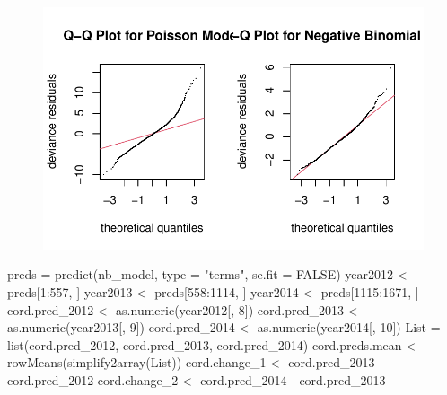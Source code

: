 \documentclass[
  letterpaper,
  DIV=11,
  numbers=noendperiod]{scrartcl}
\newenvironment{Shaded}{\begin{snugshade}}{\end{snugshade}}
\newcommand{\AttributeTok}[1]{\textcolor[rgb]{0.40,0.45,0.13}{#1}}
\newcommand{\ConstantTok}[1]{\textcolor[rgb]{0.56,0.35,0.01}{#1}}
\newcommand{\DecValTok}[1]{\textcolor[rgb]{0.68,0.00,0.00}{#1}}
\newcommand{\FunctionTok}[1]{\textcolor[rgb]{0.28,0.35,0.67}{#1}}
\newcommand{\NormalTok}[1]{\textcolor[rgb]{0.00,0.23,0.31}{#1}}
\newcommand{\OtherTok}[1]{\textcolor[rgb]{0.00,0.23,0.31}{#1}}
\newcommand{\SpecialCharTok}[1]{\textcolor[rgb]{0.37,0.37,0.37}{#1}}
\newcommand{\StringTok}[1]{\textcolor[rgb]{0.13,0.47,0.30}{#1}}
\begin{document}
\begin{figure}[H]

{\centering \includegraphics{Group34Coursework_files/figure-pdf/unnamed-chunk-19-1.pdf}

}

\end{figure}

\begin{Shaded}
\begin{Highlighting}[]
\NormalTok{preds }\OtherTok{=} \FunctionTok{predict}\NormalTok{(nb\_model, }\AttributeTok{type =} \StringTok{"terms"}\NormalTok{, }\AttributeTok{se.fit =} \ConstantTok{FALSE}\NormalTok{)}
\NormalTok{year2012 }\OtherTok{\textless{}{-}}\NormalTok{ preds[}\DecValTok{1}\SpecialCharTok{:}\DecValTok{557}\NormalTok{, ]}
\NormalTok{year2013 }\OtherTok{\textless{}{-}}\NormalTok{ preds[}\DecValTok{558}\SpecialCharTok{:}\DecValTok{1114}\NormalTok{, ]}
\NormalTok{year2014 }\OtherTok{\textless{}{-}}\NormalTok{ preds[}\DecValTok{1115}\SpecialCharTok{:}\DecValTok{1671}\NormalTok{, ]}
\NormalTok{cord.pred\_2012 }\OtherTok{\textless{}{-}} \FunctionTok{as.numeric}\NormalTok{(year2012[, }\DecValTok{8}\NormalTok{])}
\NormalTok{cord.pred\_2013 }\OtherTok{\textless{}{-}} \FunctionTok{as.numeric}\NormalTok{(year2013[, }\DecValTok{9}\NormalTok{])}
\NormalTok{cord.pred\_2014 }\OtherTok{\textless{}{-}} \FunctionTok{as.numeric}\NormalTok{(year2014[, }\DecValTok{10}\NormalTok{])}
\NormalTok{List }\OtherTok{=} \FunctionTok{list}\NormalTok{(cord.pred\_2012, cord.pred\_2013, cord.pred\_2014)}
\NormalTok{cord.preds.mean }\OtherTok{\textless{}{-}} \FunctionTok{rowMeans}\NormalTok{(}\FunctionTok{simplify2array}\NormalTok{(List))}
\NormalTok{cord.change\_1 }\OtherTok{\textless{}{-}}\NormalTok{ cord.pred\_2013 }\SpecialCharTok{{-}}\NormalTok{ cord.pred\_2012}
\NormalTok{cord.change\_2 }\OtherTok{\textless{}{-}}\NormalTok{ cord.pred\_2014 }\SpecialCharTok{{-}}\NormalTok{ cord.pred\_2013}
\end{Highlighting}
\end{Shaded}
\end{document}
